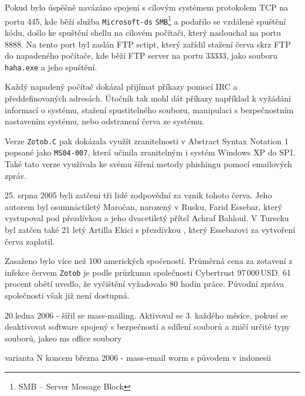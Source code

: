 \documentclass[a4paper,12pt]{article}
\begin{document}
Pokud bylo úspěšně navázáno spojení s cílovým systémem protokolem TCP na portu 445, kde běží služba \texttt{Microsoft-ds} \texttt{SMB}\footnote{SMB -- Server Message Block} a podařilo se vzdálené spuštění kódu, došlo ke spuštění shellu na cílovém počítači, který naslouchal na portu 8888. Na tento port byl zaslán FTP sctipt, který zařídil stažení červa skrz FTP do napadeného počítače, kde běží FTP server na portu 33333, jako souboru \texttt{haha.exe} a jeho spuštění\cite{zotob-fsecure}\cite{zotobb-fsecure}.

Každý napadený počítač dokázal přijímat příkazy pomocí IRC a předdefinovaných adresách. Útočník tak mohl dát příkazy například k vyžádání informací o systému, stažení spustitelného souboru, manipulaci s bezpečnostním nastavením systému, nebo odstranení červa ze systému.

Verze \texttt{Zotob.C} pak dokázala využít zranitelnosti v Abstract Syntax Notation 1 popsané jako \texttt{MS04-007}, která učinila zranitelným i systém Windows XP do SP1\cite{zotob-msbulletin2}. Také tato verze využívala ke svému šíření metody phishingu pomocí emailových zpráv.\cite{zotobc-fsecure}

25. srpna 2005 byli zatčeni tři lidé zodpovědní za vznik tohoto červa. Jeho autorem byl osumnáctiletý Maročan, narozený v Rusku, Farid Essebar, který vystupoval pod přezdívkou  a jeho dvacetiletý přítel Achraf Bahloul. V Turecku byl zatčen také 21 letý Artilla Ekici s přezdívkou , který Essebarovi za vytvoření červa zaplatil.\cite{zotob-schneider}\cite{zotob-fbi}

Zasaženo bylo více než 100 amerických spočeností\cite{zotob-fbi}. Průměrná cena za zotavení z infekce červem \texttt{Zotob} je podle průzkumu společnosti Cybertrust 97\,000\,USD. 61 procent obětí uvedlo, že vyčištění vyžadovalo 80 hodin práce.\cite{zotob-wikidot}\cite{zotob-cnet} Původní zpráva společnosti však již není dostupná.

20.ledna 2006 - šířil se mass-mailing. Aktivoval se 3. každého měsíce, pokusí se deaktivovat software spojený s bezpečností a sdílení souborů a zničí určité typy souborů, jakeo ms office soubory

varianta N koncem března 2006 - mass-email worm s původem v indonesii
\end{document}

